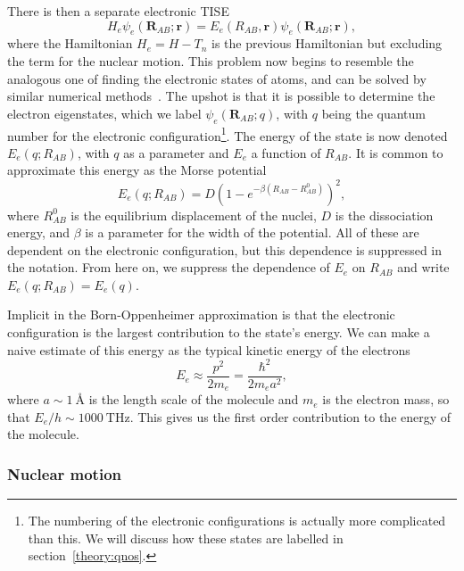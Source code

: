 There is then a separate electronic TISE
%
\begin{equation}
  H_e \psi_e(\mathbf{R}_{AB}; \mathbf{r}) = E_e(R_{AB}, \mathbf{r})\psi_e(\mathbf{R}_{AB};
  \mathbf{r}),
  \label{theory:eqn:TISEelectron}
\end{equation}
%
where the Hamiltonian $H_e = H - T_n$ is the previous Hamiltonian but excluding
the term for the nuclear motion.
%
This problem now begins to resemble the analogous one of finding the electronic
states of atoms, and can be solved by similar numerical methods~\cite{Foot2005,
bransden2003}. The upshot is that it is possible to determine the electron
eigenstates, which we label $\psi_e(\mathbf{R}_{AB}; q)$, with $q$ being the
quantum number for the electronic configuration\footnote{The numbering of the
electronic configurations is actually more complicated than this. We will
discuss how these states are labelled in section~\ref{theory:qnos}.}. The
energy of the state is now denoted $E_e(q; R_{AB})$, with $q$ as a parameter
and $E_e$ a function of  $R_{AB}$.  It is common to approximate this energy as
the Morse potential
%
\begin{equation}
  E_e(q; R_{AB}) = D(1-e^{-\beta(R_{AB} - R_{AB}^0)})^2,
\end{equation}
%
where $R_{AB}^0$ is the equilibrium displacement of the nuclei, $D$ is the
dissociation energy, and $\beta$ is a parameter for the width of the
potential. All of these are dependent on the electronic configuration, but this
dependence is suppressed in the notation. From here on, we suppress the
dependence of $E_e$ on $R_{AB}$ and write $E_e(q; R_{AB}) = E_e(q)$.

Implicit in the Born-Oppenheimer approximation is that the electronic
configuration is the largest contribution to the state's energy. We can make a
naive estimate of this energy as the typical kinetic energy of the electrons
%
\begin{equation}
  E_e \approx \frac{p^2}{2m_e} = \frac{\hbar^2}{2m_e a^2},
\end{equation}
%
where $a\sim\SI{1}{\angstrom}$ is the length scale of the molecule and $m_e$ is
the electron mass, so that $E_e/h \sim \SI{1000}{\tera\hertz}$. This
gives us the first order contribution to the energy of the molecule. 

\subsubsection{Nuclear motion}

